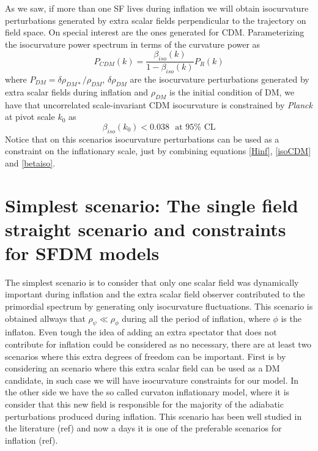 \documentclass[amssymb,twocolumn,prd,nofootinbib,showpacs]{revtex4-1}
\begin{document}
As we saw, if more than one SF lives during inflation we will obtain isocurvature perturbations generated by extra scalar fields perpendicular to the trajectory on field space. On special interest are the ones generated for CDM. Parameterizing the isocurvature power spectrum in terms of the curvature power as
\begin{equation}\label{isoCDM}
P_{CDM}(k) = \frac{\beta_{iso}(k)}{1-\beta_{iso}(k)}P_R(k)
\end{equation}
where $P_{DM}=\delta \rho_{DM*}/\rho_{DM}$, $\delta\rho_{DM}$ are the isocurvature perturbations generated by extra scalar fields during inflation and $\rho_{DM}$ is the initial condition of DM, we have that uncorrelated scale-invariant CDM isocurvature is constrained by \textit{Planck} \cite{const1,const2} at pivot scale $k_0$ as
\begin{equation}\label{betaiso}
\beta_{iso}(k_0)<0.038 \ \ \ \text{at $95\%$ CL}
\end{equation}
Notice that on this scenarios isocurvature perturbations can be used as a constraint on the inflationary scale, just by combining equations \eqref{Hinf}, \eqref{isoCDM} and \eqref{betaiso}.
%
%
%
%
%
%
\section{Simplest scenario: The single field straight scenario and constraints for SFDM models}

The simplest scenario is to consider that only one scalar field was dynamically important during inflation and the extra scalar field observer contributed to the primordial spectrum by generating only isocurvature fluctuations. This scenario is obtained allways that $\rho_{\psi}\ll \rho_{\phi}$ during all the period of inflation, where $\phi$ is the inflaton. Even tough the idea of adding an extra spectator that does not contribute for inflation could be considered as no necessary, there are at least two scenarios where this extra degrees of freedom can be important. First is by considering an scenario where this extra scalar field can be used as a DM candidate, in such case we will have isocurvature constraints for our model. In the other side we have the so called curvaton inflationary model, where it is consider that this new field is responsible for the majority of the adiabatic perturbations produced during inflation. This scenario has been well studied in the literature (ref) and now a days it is one of the preferable scenarios for inflation (ref). 
\end{document}
